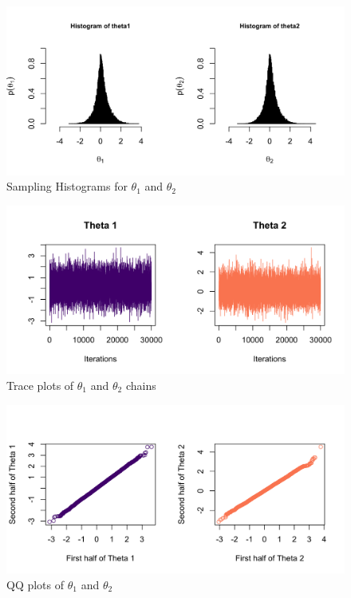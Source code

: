 \documentclass[12pt]{article}
\begin{document}
\begin{figure}[h!]
    \centering
    \includegraphics[width=0.8\linewidth]{pictures/fig02-gs-histogram.png}
    \caption{Sampling Histograms for $\theta_1$ and $\theta_2$ }
    \label{fig:gs-histogram}
\end{figure}

\begin{figure}[h!]
    \centering
    \includegraphics[width=0.8\linewidth]{pictures/fig01-gs-traceplot.png}
    \caption{Trace plots of $\theta_1$ and $\theta_2$ chains }
    \label{fig:gs-traceplot}
\end{figure}


\begin{figure}[h!]
    \centering
    \includegraphics[width=0.8\linewidth]{pictures/fig03-gs-qqplots.png}
    \caption{QQ plots of $\theta_1$ and $\theta_2$ }
    \label{fig:gs-qqplot}
\end{figure}
\end{document}
